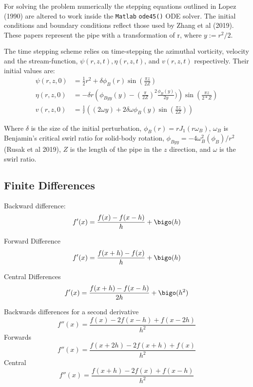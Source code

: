 \documentclass{X:/Documents/Coding/Latex/myreport}
\begin{document}
For solving the problem numerically the stepping equations outlined in Lopez (1990) are altered to work inside the \verb|Matlab| \verb|ode45()| ODE solver. The initial conditions and boundary conditions reflect those used by Zhang et al (2019).
These papers represent the pipe with a transformation of r, where $y := r^2/2$. 

The time stepping scheme relies on time-stepping the azimuthal vorticity, velocity and the stream-function, $\psi(r,z,t), \eta(r,z,t)$, and $v(r,z,t)$ respectively. Their initial values are:
\begin{align*}
    \psi(r,z,0) &= \frac12 r^2 + \delta \phi_B(r) \sin \left(\frac{\pi z}{2Z}\right)\\
    \eta(r,z,0) &= - \delta  r\left(\phi_{Byy}(y) - (\frac{\pi}{2Z})^2\frac{\phi_B(y)}{2y})\right)\sin(\frac{\pi z}{2*Z})\\
    v(r,z,0) &= \frac{1}{r} \left((2\omega y) + 2\delta\omega\phi_B(y)\sin\left(\frac{\pi z}{2Z}\right)\right)
\end{align*}

Where $\delta$ is the size of the initial perturbation, $\phi_B(r) = r J_1(r \omega_B)$, $\omega_B$ is Benjamin's critical swirl ratio for solid-body rotation, $\phi_{Byy} = -4 \omega_B^2 (\phi_B)/r^2$ (Rusak et al 2019), $Z$ is the length of the pipe in the $z$ direction, and $\omega$ is the swirl ratio.




\subsection{Finite Differences}
Backward difference:
\[f'(x) = \frac{f(x) - f(x-h)}{h} + \bigo(h)\]

Forward Difference
\[f'(x) = \frac{f(x+h) - f(x)}{h}+ \bigo(h)\]

Central Differences
\[f'(x) = \frac{f(x+h) - f(x-h)}{2h}+ \bigo(h^2)\]

Backwards differences for a second derivative
\[f''(x) = \frac{f(x) - 2f(x-h) + f(x-2h)}{h^2}\]
Forwards
\[f''(x) = \frac{f(x+2h) - 2f(x+h) + f(x)}{h^2}\]
Central 
\[f''(x) = \frac{f(x+h) - 2 f(x) + f(x-h)}{h^2}\]










\end{document}
